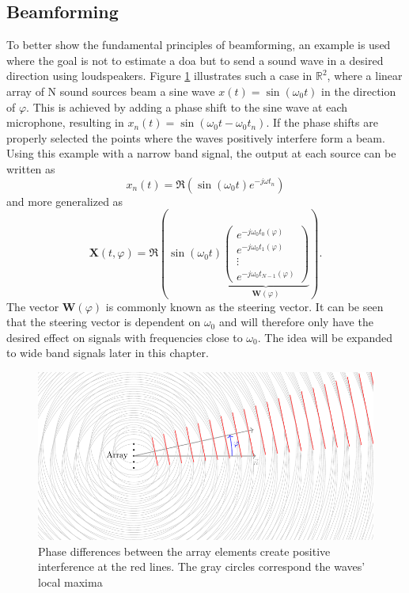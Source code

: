 \subsection{Beamforming}
To better show the fundamental principles of beamforming, an example is used
where the goal is not to estimate a \acrshort{doa} but to send a sound wave
in a desired direction using loudspeakers.
Figure \ref{ssl:fig:beamforming1} illustrates such a case in $\mathbb{R}^2$,
where a linear array of N sound sources beam a sine wave $x(t) = \sin(\omega_0 t)$
in the direction of $\varphi$.
This is achieved by adding a phase shift to the sine wave
at each microphone, resulting in $x_n(t) = \sin(\omega_0 t - \omega_0t_n)$.
If the phase shifts are properly selected the points where the waves positively
interfere form a beam.
Using this example with a narrow band signal, the output at each source
can be written as
\begin{equation}
	x_n(t) = \Re(\sin(\omega_0 t) e^{-j\omega t_n})
\end{equation}
and more generalized as
\begin{equation}
	\label{ssl:eq:beamSteerOut}
	\bm{X}(t, \varphi) =
	\Re\left(
	\sin(\omega_0 t)
	\underbrace{
		\begin{pmatrix}
			e^{-j\omega_0 t_0(\varphi)} \\
			e^{-j\omega_0 t_1(\varphi)} \\
			\vdots                      \\
			e^{-j\omega_0 t_{N-1}(\varphi)}
		\end{pmatrix}}_{\bm{W}(\varphi)}
	\right).
\end{equation}
The vector $\bm{W}(\varphi)$ is commonly known as the steering vector.
It can be seen that the steering vector is dependent on $\omega_0$ and
will therefore only have the desired effect on signals with frequencies
close to $\omega_0$.
The idea will be expanded to wide band signals later in this chapter.
\begin{figure}
	\centering
	\includegraphics[]{images/3_source_localization/beamforming_1.pdf}
	\caption{Phase differences between the array elements create positive interference at the red lines.
		The gray circles correspond the waves' local maxima}
	\label{ssl:fig:beamforming1}
\end{figure}

